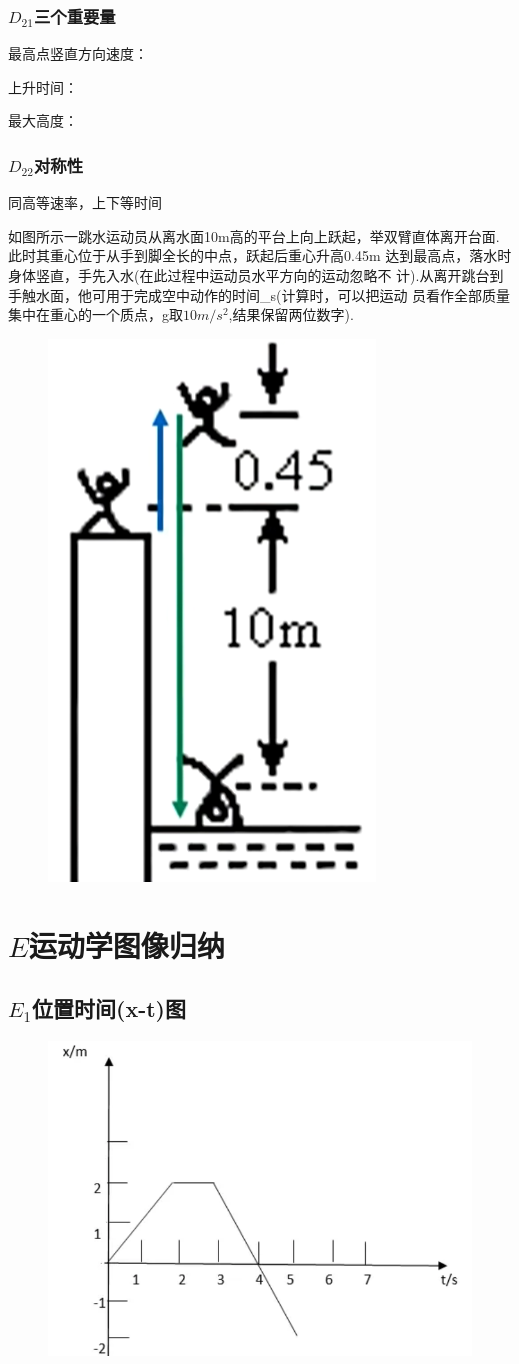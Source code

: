 \documentclass[lang=cn,10pt]{elegantbook}
\begin{document}
	\subsubsection{$D_{21}$三个重要量}
	
	最高点竖直方向速度：
	
	上升时间：
	
	最大高度：
	
	\vspace{2cm}
	
	\subsubsection{$D_{22}$对称性}
	同高等速率，上下等时间
	
	\begin{example}
		如图所示一跳水运动员从离水面10m高的平台上向上跃起，举双臂直体离开台面.此时其重心位于从手到脚全长的中点，跃起后重心升高0.45m 达到最高点，落水时身体竖直，手先入水(在此过程中运动员水平方向的运动忽略不
		计).从离开跳台到手触水面，他可用于完成空中动作的时间\_s(计算时，可以把运动
		员看作全部质量集中在重心的一个质点，g取$10m/s^2$,结果保留两位数字).
	\end{example}
	\begin{figure}[H]
		\centering
		\includegraphics[width=0.2\linewidth]{image/7}
	\end{figure}
	\vspace{2cm}
	\section{$E$运动学图像归纳}
	\subsection{$E_1$位置时间(x-t)图}
	\begin{figure}[H]
		\centering
		\includegraphics[width=0.3\linewidth]{image/8}
	\end{figure}
\end{document}
